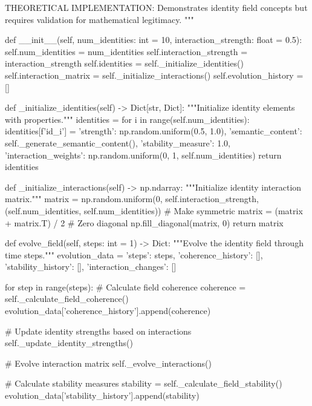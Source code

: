     THEORETICAL IMPLEMENTATION: Demonstrates identity field concepts
    but requires validation for mathematical legitimacy.
    """
    
    def __init__(self, num_identities: int = 10, interaction_strength: float = 0.5):
        self.num_identities = num_identities
        self.interaction_strength = interaction_strength
        self.identities = self._initialize_identities()
        self.interaction_matrix = self._initialize_interactions()
        self.evolution_history = []
        
    def _initialize_identities(self) -> Dict[str, Dict]:
        """Initialize identity elements with properties."""
        identities = {}
        for i in range(self.num_identities):
            identities[f'id_{i}'] = {
                'strength': np.random.uniform(0.5, 1.0),
                'semantic_content': self._generate_semantic_content(),
                'stability_measure': 1.0,
                'interaction_weights': np.random.uniform(0, 1, self.num_identities)
            }
        return identities
        
    def _initialize_interactions(self) -> np.ndarray:
        """Initialize identity interaction matrix."""
        matrix = np.random.uniform(0, self.interaction_strength, 
                                 (self.num_identities, self.num_identities))
        \# Make symmetric
        matrix = (matrix + matrix.T) / 2
        \# Zero diagonal
        np.fill_diagonal(matrix, 0)
        return matrix
        
    def evolve_field(self, steps: int = 1) -> Dict:
        """Evolve the identity field through time steps."""
        evolution_data = {
            'steps': steps,
            'coherence_history': [],
            'stability_history': [],
            'interaction_changes': []
        }
        
        for step in range(steps):
            \# Calculate field coherence
            coherence = self._calculate_field_coherence()
            evolution_data['coherence_history'].append(coherence)
            
            \# Update identity strengths based on interactions
            self._update_identity_strengths()
            
            \# Evolve interaction matrix
            self._evolve_interactions()
            
            \# Calculate stability measures
            stability = self._calculate_field_stability()
            evolution_data['stability_history'].append(stability)
            
